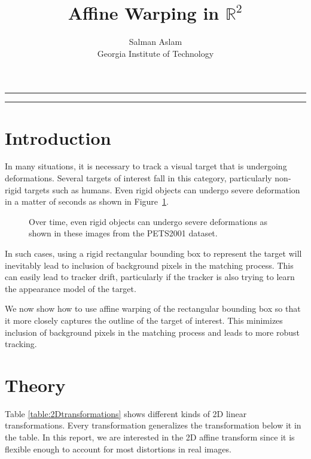 
\title{Affine Warping in $\mathbb{R}^2$}
\author{Salman Aslam\\ Georgia Institute of Technology}
\date{}


\maketitle
\rule[0pt]{\textwidth}{1pt}
\tableofcontents
\rule[0pt]{\textwidth}{1pt}
\section{Introduction}
In many situations, it is necessary to track a visual target that is undergoing deformations.  Several targets of interest fall in this category, particularly non-rigid targets such as humans.  Even rigid objects can undergo severe deformation in a matter of seconds as shown in Figure~\ref{Fig:PETS2001_deformation}.  


								\begin{figure}
								\caption{Over time, even rigid objects can undergo severe deformations as shown in these images from the PETS2001 dataset.}
								\label{Fig:PETS2001_deformation}
								\end{figure}

In such cases, using a rigid rectangular bounding box to represent the target will inevitably lead to inclusion of background pixels in the matching process.  This can easily lead to tracker drift, particularly if the tracker is also trying to learn the appearance model of the target.

We now show how to use affine warping of the rectangular bounding box so that it more closely captures the outline of the target of interest.  This minimizes inclusion of background pixels in the matching process and leads to more robust tracking.

\section{Theory}
Table \ref{table:2Dtransformations} shows different kinds of 2D linear transformations.  Every transformation generalizes the transformation below it in the table.  In this report, we are interested in the 2D affine transform since it is flexible enough to account for most distortions in real images.

